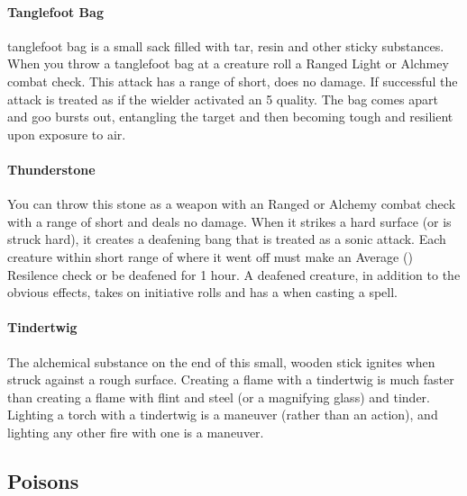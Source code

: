 \begin{multicols}{2}
\paragraph{Tanglefoot Bag} \label{alcitm:tanglefootbag}
tanglefoot bag is a small sack filled with tar, resin
and other sticky substances. When you throw a
tanglefoot bag at a creature roll a Ranged Light or
Alchmey combat check. This attack has a range of
short, does no damage. If successful the attack is treated
as if the wielder activated an  5 quality. The
bag comes apart and goo bursts out, entangling the
target and then becoming tough and resilient upon
exposure to air.

\paragraph{Thunderstone} \label{alcitm:thunderstone}
You can throw this stone as a weapon with an Ranged or
Alchemy combat check with a range of short and deals no damage.
When it strikes a hard surface (or is struck hard), it creates
a deafening bang that is treated as a sonic attack. Each creature
within short range of where it went off must make an Average
(\difficulty\difficulty) Resilence check or be deafened for 1
hour. A deafened creature, in addition to the obvious effects,
takes \setback\setback on initiative rolls and has a \setback
when casting a spell.

\paragraph{Tindertwig} \label{alcitm:tindertwig}
The alchemical substance on the end of this small,
wooden stick ignites when struck against a rough
surface. Creating a flame with a tindertwig is much
faster than creating a flame with flint and steel (or a
magnifying glass) and tinder. Lighting a torch with a
tindertwig is a maneuver (rather than an action), and
lighting any other fire with one is a maneuver.

\end{multicols}
\hrulefill

\subsection{Poisons}\label{chap:poisons}

